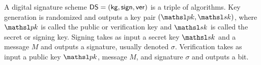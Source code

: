 



\bigskip

A digital signature scheme ${\mathsf{DS}} = ({\sf kg},{\mathsf{sign}},\mathsf{ver})$ is a triple of
algorithms. Key generation is randomized and outputs a key pair $(\pk,\sk)$,
where $\pk$ is called the public or verification key and $\sk$ is called the secret or
signing key.
Signing takes as input a secret key $\sk$ and a message $M$ and outputs a
signature, usually denoted $\sigma$.
Verification takes as input a public key $\pk$, message $M$, and signature
$\sigma$ and outputs a
bit.




